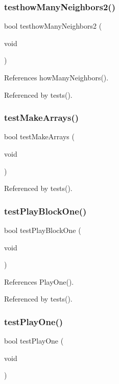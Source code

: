 \subsubsection{testhow\+Many\+Neighbors2()}
{\footnotesize\ttfamily bool testhow\+Many\+Neighbors2 (\begin{DoxyParamCaption}\item[{void}]{ }\end{DoxyParamCaption})}



References how\+Many\+Neighbors().



Referenced by tests().

\mbox{\label{tests_8c_af6e338851f3ccb4714e1bfb06ec4b428}} 
\subsubsection{test\+Make\+Arrays()}
{\footnotesize\ttfamily bool test\+Make\+Arrays (\begin{DoxyParamCaption}\item[{void}]{ }\end{DoxyParamCaption})}



Referenced by tests().

\mbox{\label{tests_8c_a4db05b9d62de31287c08dabadb3dacde}} 
\subsubsection{test\+Play\+Block\+One()}
{\footnotesize\ttfamily bool test\+Play\+Block\+One (\begin{DoxyParamCaption}\item[{void}]{ }\end{DoxyParamCaption})}



References Play\+One().



Referenced by tests().

\mbox{\label{tests_8c_aa4c8095a20d90a18d843ab63ecd02d00}} 
\subsubsection{test\+Play\+One()}
{\footnotesize\ttfamily bool test\+Play\+One (\begin{DoxyParamCaption}\item[{void}]{ }\end{DoxyParamCaption})}



